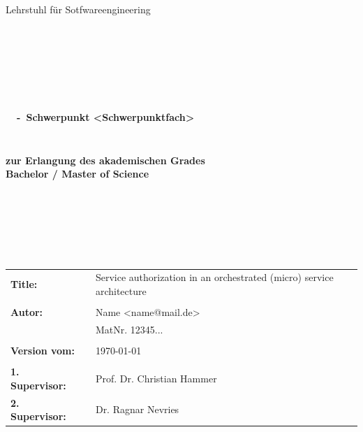 \begin{center}
\Large{Lehrstuhl für Sotfwareengineering}
\end{center}
\begin{verbatim}




\end{verbatim}
\begin{center}
\doublespacing
\textbf{\LARGE{\titleDocument}}\\
\singlespacing
\begin{verbatim}

\end{verbatim}
\textbf{{~\subjectDocument~-~Schwerpunkt <Schwerpunktfach>}}
\end{center}
\begin{verbatim}

\end{verbatim}
\begin{center}

\end{center}
\begin{verbatim}

\end{verbatim}
\begin{center}
\textbf{zur Erlangung des akademischen Grades \\ Bachelor / Master of Science}
\end{center}
\begin{verbatim}






\end{verbatim}
\begin{flushleft}
\begin{tabular}{llll}
\textbf{Title:} & & Service authorization in an orchestrated (micro) service architecture & \\
& & \\
\textbf{Autor:} & & Name <name@mail.de>& \\
& & MatNr. 12345... & \\
& & \\
\textbf{Version vom:} & & \today &\\
& & \\
\textbf{1. Supervisor:} & & Prof. Dr. Christian Hammer &\\
\textbf{2. Supervisor:} & &  Dr. Ragnar Nevries &\\
\end{tabular}
\end{flushleft}
